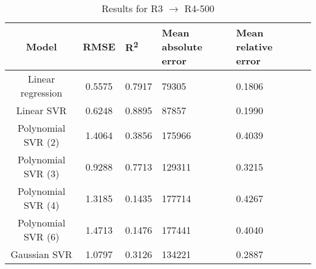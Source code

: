 \begin{table}[H]
\centering
\begin{adjustbox}{center}
\begin{tabular}{c | c M{1.2cm} M{2.5cm} M{2.5cm} M{1.8cm}}
Model & RMSE & R\textsuperscript{2} & Mean absolute error & Mean relative error \tabularnewline
\hline
Linear regression & 0.5575 & 0.7917 &  79305 & 0.1806 \\
Linear SVR & 0.6248 & 0.8895 &  87857 & 0.1990 \\
Polynomial SVR (2) & 1.4064 & 0.3856 & 175966 & 0.4039 \\
Polynomial SVR (3) & 0.9288 & 0.7713 & 129311 & 0.3215 \\
Polynomial SVR (4) & 1.3185 & 0.1435 & 177714 & 0.4267 \\
Polynomial SVR (6) & 1.4713 & 0.1476 & 177441 & 0.4040 \\
Gaussian SVR & 1.0797 & 0.3126 & 134221 & 0.2887 \\
\end{tabular}
\end{adjustbox}
\\
\caption{Results for R3 $\rightarrow$ R4-500}
\label{tab:coreonly_linear_R3_R4_500}
\end{table}
